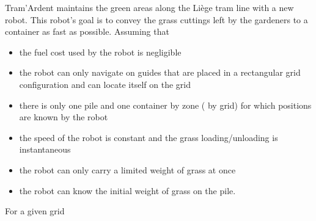 \documentclass[11pt, a4paper]{exam}
\begin{document}
\begin{exercises}[1, 3 (a)--(c), 5]


Tram'Ardent maintains the green areas along the Liège tram line with a new robot. This robot's goal is to convey the grass cuttings left by the gardeners to a container as fast as possible. Assuming that
\begin{itemize}
    \item the fuel cost used by the robot is negligible
    \item the robot can only navigate on guides that are placed in a rectangular grid configuration and can locate itself on the grid
    \item there is only one pile and one container by zone (\ie{} by grid) for which positions are known by the robot
    \item the speed of the robot is constant and the grass loading/unloading is instantaneous
    \item the robot can only carry a limited weight of grass at once
    \item the robot can know the initial weight of grass on the pile.
\end{itemize}
For a given grid

\end{exercises}
\end{document}
